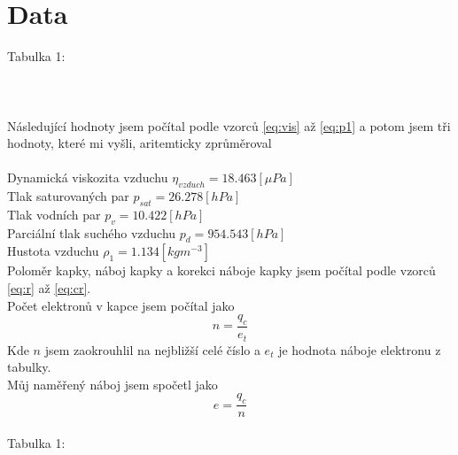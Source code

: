 \documentclass{article}
\begin{document}
\section{Data}
\footnotesize{Tabulka 1:}\\
\\
\normalsize{
}
\\
\vspace{1em}
\\
Následující hodnoty jsem počítal podle vzorců \ref{eq:vis} až \ref{eq:p1} a potom jsem
tři hodnoty, které mi vyšli, aritemticky zprůměroval\\\\
Dynamická viskozita vzduchu $\eta_{vzduch} = 18.463 [\mu Pa]$ \\
Tlak saturovaných par $p_{sat} = 26.278 [hPa]$ \\
Tlak vodních par $p_{v} = 10.422 [hPa]$ \\
Parciální tlak suchého vzduchu $p_{d} = 954.543 [hPa]$ \\
Hustota vzduchu $\rho_{1} = 1.134 [kg m^{-3}]$ \\
\newpage
Poloměr kapky, náboj kapky a korekci náboje kapky jsem počítal podle vzorců
\ref{eq:r} až \ref{eq:cr}.\\
Počet elektronů v kapce jsem počítal jako
$$n = \frac{q_{c}}{e_{t}}$$
Kde $n$ jsem zaokrouhlil na nejbližší celé číslo a $e_{t}$ je hodnota náboje elektronu z tabulky.\\
Můj naměřený náboj jsem spočetl jako
$$e = \frac{q_{c}}{n}$$
\\
\footnotesize{Tabulka 1:}\\
\\
\normalsize{
}
\end{document}
